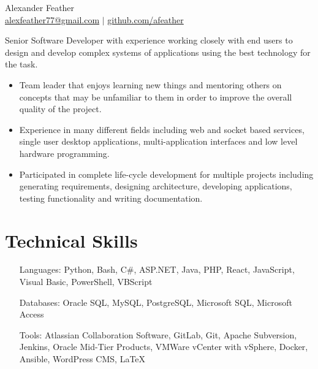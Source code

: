 \documentclass[11pt, letterpaper]{article}
\begin{document}
\pagestyle{empty}
\selectfont
\begin{center}
{\huge Alexander Feather} \\
\vspace{0.1cm}
\href{mailto:alexfeather77@gmail.com}{alexfeather77@gmail.com} \(|\) \href{https://github.com/afeather}{github.com/afeather}
\end{center}
\vspace{-0.2cm}
Senior Software Developer with experience working closely with end users to design and develop complex systems of applications using the best technology for the task.
\begin{itemize}[itemsep=0cm, parsep=0.2cm]
    \item Team leader that enjoys learning new things and mentoring others on concepts that may be unfamiliar to them in order to improve the overall quality of the project.
    \item Experience in many different fields including web and socket based services, single user desktop applications, multi-application interfaces and low level hardware programming.
    \item Participated in complete life-cycle development for multiple projects including generating requirements, designing architecture, developing applications, testing functionality and writing documentation. 
\end{itemize}
\vspace{-0.6cm}
\section*{\selectfont Technical Skills}
\vspace{-0.2cm}
\begin{itemize}[itemsep=0cm, leftmargin=0.9in, align=parleft, labelwidth=0.8in]
    \item[Languages:] Python, Bash, C\#, ASP.NET, Java, PHP, React, JavaScript, Visual Basic, PowerShell, VBScript
    \item[Databases:] Oracle SQL, MySQL, PostgreSQL, Microsoft SQL, Microsoft Access
    \item[Tools:] Atlassian Collaboration Software, GitLab, Git, Apache Subversion, Jenkins, Oracle Mid-Tier Products, VMWare vCenter with vSphere, Docker, Ansible, WordPress CMS, \LaTeX
\end{itemize}
\vspace{-0.8cm}
\end{document}
